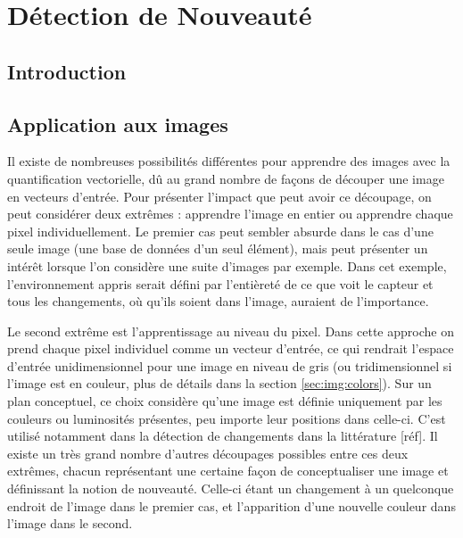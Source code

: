 
\chapter{Détection de Nouveauté}
	\minitoc
	\newpage




			
	\section{Introduction}

	\section{Application aux images}\label{sec:images}

	Il existe de nombreuses possibilités différentes pour apprendre des images avec la quantification vectorielle, dû au grand nombre de façons de découper une image en vecteurs d'entrée. Pour présenter l'impact que peut avoir ce découpage, on peut considérer deux extrêmes : apprendre l'image en entier ou apprendre chaque pixel individuellement. Le premier cas peut sembler absurde dans le cas d'une seule image (une base de données d'un seul élément), mais peut présenter un intérêt lorsque l'on considère une suite d'images par exemple. Dans cet exemple, l'environnement appris serait défini par l'entièreté de ce que voit le capteur et tous les changements, où qu'ils soient dans l'image, auraient de l'importance.

	Le second extrême est l'apprentissage au niveau du pixel. Dans cette approche on prend chaque pixel individuel comme un vecteur d'entrée, ce qui rendrait l'espace d'entrée unidimensionnel pour une image en niveau de gris (ou tridimensionnel si l'image est en couleur, plus de détails dans la section \ref{sec:img:colors}). Sur un plan conceptuel, ce choix considère qu'une image est définie uniquement par les couleurs ou luminosités présentes, peu importe leur positions dans celle-ci. C'est utilisé notamment dans la détection de changements dans la littérature [réf]. Il existe un très grand nombre d'autres découpages possibles entre ces deux extrêmes, chacun représentant une certaine façon de conceptualiser une image et définissant la notion de nouveauté. Celle-ci étant un changement à un quelconque endroit de l'image dans le premier cas, et l'apparition d'une nouvelle couleur dans l'image dans le second.

